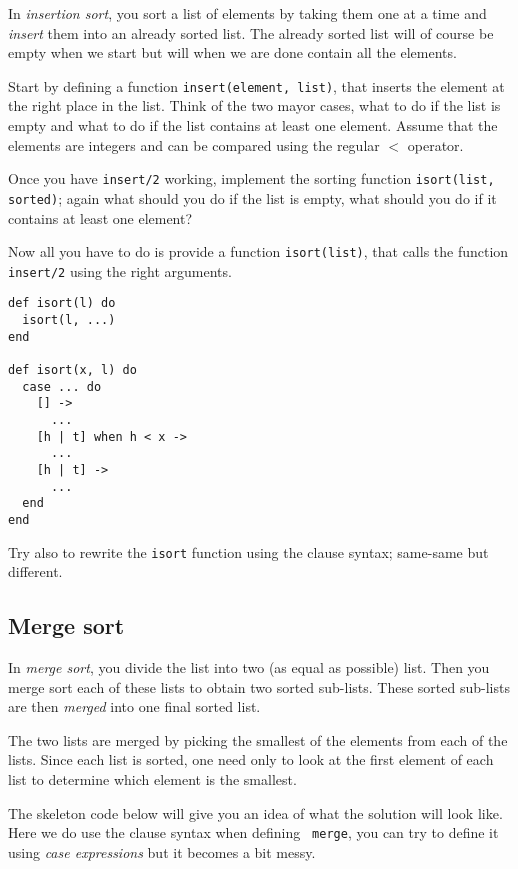 \documentclass[a4paper,11pt]{article}
\begin{document}
In {\em insertion sort}, you sort a list of elements by taking them
one at a time and {\em insert} them into an already sorted list. The
already sorted list will of course be empty when we start but will
when we are done contain all the elements.

Start by defining a function {\tt insert(element, list)}, that inserts
the element at the right place in the list. Think of the two mayor
cases, what to do if the list is empty and what to do if the list
contains at least one element. Assume that the elements are integers
and can be compared using the regular $<$ operator.

Once you have {\tt insert/2} working, implement the sorting function
{\tt isort(list, sorted)}; again what should you do if the list is
empty, what should you do if it contains at least one element?

Now all you have to do is provide a function {\tt isort(list)}, that
calls the function {\tt insert/2} using the right arguments.

\begin{verbatim}
def isort(l) do 
  isort(l, ...)
end

def isort(x, l) do
  case ... do
    [] -> 
      ...
    [h | t] when h < x ->
      ...
    [h | t] ->
      ...
  end
end
\end{verbatim}

Try also to rewrite the {\tt isort} function using the clause syntax;
same-same but different.


\subsection{Merge sort}

In {\em merge sort}, you divide the list into two (as equal as
possible) list. Then you merge sort each of these lists to obtain two
sorted sub-lists. These sorted sub-lists are then {\em merged} into
one final sorted list. 

The two lists are merged by picking the smallest of the elements from
each of the lists. Since each list is sorted, one need only to look at
the first element of each list to determine which element is the
smallest.

The skeleton code below will give you an idea of what the solution
will look like. Here we do use the clause syntax when defining {\tt
  merge}, you can try to define it using {\em case expressions} but it
becomes a bit messy.

\pagebreak
\end{document}
